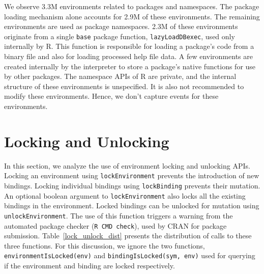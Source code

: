 \documentclass[10pt,review,sigplan,anonymous=true,authorversion=true,nonacm=true]{acmart}
\newcommand{\code}[1]{\lstinline |#1|\xspace}
\renewcommand{\c}[1]{\lstinline |#1|\xspace}
\begin{document}
We observe 3.3M environments related to packages and namespaces. The package
loading mechanism alone accounts for 2.9M of these environments. The remaining
environments are used as package namespaces. 2.3M of these environments
originate from a single \code{base} package function, \code{lazyLoadDBexec},
used only internally by R. This function is responsible for loading a package's
code from a binary file and also for loading processed help file data. A few
environments are created internally by the interpreter to store a package's
native functions for use by other packages. The namespace APIs of R are private,
and the internal structure of these environments is unspecified. It is also not
recommended to modify these environments. Hence, we don't capture events for
these environments.


\section{Locking and Unlocking}

In this section, we analyze the use of environment locking and unlocking APIs.
Locking an environment using \c{lockEnvironment} prevents the introduction of
new bindings. Locking individual bindings using \c{lockBinding} prevents their
mutation. An optional boolean argument to \c{lockEnvironment} also locks all the
existing bindings in the environment. Locked bindings can be unlocked for
mutation using \c{unlockEnvironment}. The use of this function triggers a
warning from the automated package checker (\c{R CMD check}), used by CRAN for
package submission. Table~\ref{lock_unlock_dist} presents the distribution of
calls to these three functions. For this discussion, we ignore the two
functions, \c{environmentIsLocked(env)} and \c{bindingIsLocked(sym, env)} used
for querying if the environment and binding are locked respectively.
\end{document}
